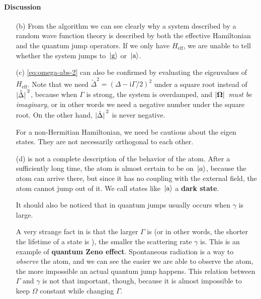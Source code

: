 \documentclass[hyperref, a4paper]{article}
\newcommand*{\ii}{\mathrm{i}}
\newcommand*{\concept}[1]{{\textbf{#1}}}
\begin{document}
\paragraph{Discussion} \begin{itemize}
\item[(b)] From the algorithm we can see clearly why a system described by a random wave function theory
is described by both the effective Hamiltonian and the quantum jump operators. 
If we only have $H_\text{eff}$, we are unable to tell whether the system jumps to $\ket*{\text{g}}$ 
or $\ket*{\text{a}}$.

\item[(c)] \eqref{eq:omega-abs-2} can also be confirmed by evaluating the eigenvalues of $H_\text{eff}$.
Note that we need $\tilde{\Delta}^2 = (\Delta - \ii \Gamma / 2)^2$ under a square root instead of 
$\abs*{\tilde{\Delta}}^2$, because when $\Gamma$ is strong, the system is overdamped, and $\abs*{\vb*{\Omega}}$
\emph{must be imaginary}, or in other words we need a negative number under the square root. On the other 
hand, $\abs*{\tilde{\Delta}}^2$ is never negative.

\begin{note*}{}{}
    For a non-Hermitian Hamiltonian, we need be cautious about the eigen states. They are not necessarily 
    orthogonal to each other.     
\end{note*}

\item[(d)]  is not a complete description of the behavior of the atom. 
After a sufficiently long time, the atom is almost certain to be on $\ket*{a}$, because the atom can arrive 
there, but since it has no coupling with the external field, the atom cannot jump out of it.
We call states like $\ket*{\text{a}}$ a \concept{dark state}.

It should also be noticed that in  quantum jumps usually occurs when $\gamma$ is large.

A very strange fact in  is that the larger $\Gamma$ is (or in other words, the 
shorter the lifetime of a state is ), the smaller the scattering rate $\gamma$ is. This is an example of 
\concept{quantum Zeno effect}. Spontaneous radiation is a way to \emph{observe} the atom, and we can see 
the easier we are able to observe the atom, the more impossible an actual quantum jump happens. 
This relation between $\Gamma$ and $\gamma$ is not that important, though, because it is almost impossible 
to keep $\Omega$ constant while changing $\Gamma$.
\end{itemize}
\end{document}
